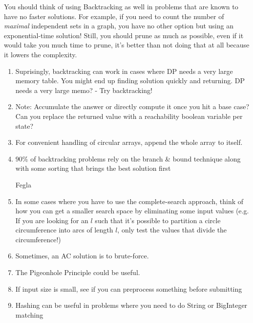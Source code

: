 \documentclass[12pt]{book}
\begin{document}
You should think of using Backtracking as well in problems that are known to have no faster solutions. For example, if you need to count the number of \textit{maximal} independent sets in a graph, you have no other option but using an exponential-time solution! Still, you should prune as much as possible, even if it would take you much time to prune, it's better than not doing that at all because it lowers the complexity.
\begin{enumerate}
\item Suprisingly, backtracking can work in cases where DP needs a very large memory table. You might end up finding solution quickly and returning. DP needs a very large memo? - Try backtracking!
\item Note: Accumulate the answer or directly compute it once you hit a base case? Can you replace the returned value with a reachability boolean variable per state?
\item For convenient handling of circular arrays, append the whole array to itself.
\item $90 \%$ of backtracking problems rely on the branch \& bound technique along with some sorting that brings the best solution first
\begin{flushright}
Fegla
\end{flushright}
\item In some cases where you have to use the complete-search approach, think of how you can get a smaller search space by eliminating some input values (e.g. If you are looking for an $l$ such that it's possible to partition a circle circumference into arcs of length $l$, only test the values that divide the circumference!)
\item Sometimes, an AC solution is to brute-force.
\item The Pigeonhole Principle could be useful.
\item If input size is small, see if you can preprocess something before submitting
\item Hashing can be useful in problems where you need to do String or BigInteger matching
\end{enumerate}
\end{document}
